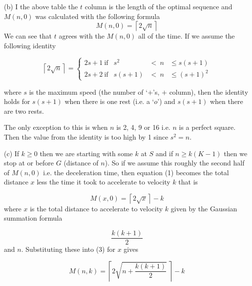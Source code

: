 \documentclass[a4paper,12pt]{article}
\begin{document}
\medskip


(b) I the above table the $t$ column is the length of the optimal sequence and $M(n,0)$  was calculated with the following formula
\begin{equation}
	M(n, 0) = \left\lceil 2\sqrt{n} \right\rceil
\end{equation}
We can see that $t$ agrees with the $M(n, 0)$ all of the time. If we assume the following identity

\begin{equation}
\left\lceil 2\sqrt{n} \right\rceil = \left\{
	\begin{array}{lrcl}
		2s + 1\ \mbox{if} &	  s^2 & <\ n & \leq s(s + 1) \\
		2s + 2\ \mbox{if} & s(s + 1) & <\ n & \leq (s + 1)^2
	\end{array} \right.
\end{equation}

where $s$ is the maximum speed (the number of `$+$'s, $+$ column),
then the identity holds for $s(s + 1)$ when there is one rest (i.e. a `$o$')
and $s(s + 1)$ when there are two rests.

The only exception to this is when $n$ is 2, 4, 9 or 16 i.e. $n$ is a perfect square. Then the value from the identity is too high by 1 since $s^2 = n$.\medskip


(c) If $k \geq 0$ then we are starting with some $k$ at $S$ and if $n \geq  k (K - 1)$ then we stop at or before $G$ (distance of $n$). So if we assume this roughly the second half of $M(n,0)$ i.e. the deceleration time, then equation (1) becomes the total distance $x$ less the time it took to accelerate to velocity $k$ that is

\begin{equation}
	M(x, 0) = \left\lceil 2\sqrt{x} \right\rceil - k
\end{equation}
where $x$ is the total distance to accelerate to velocity $k$ given by the Gaussian summation formula

\begin{equation}
	\frac{k(k + 1)}{2}
\end{equation}
and $n$. Substituting these into (3) for $x$ gives

\begin{equation}
	M(n, k) = \left\lceil 2\sqrt{n + \frac{k(k + 1)}{2}} \ \right\rceil - k
\end{equation}
\end{document}
